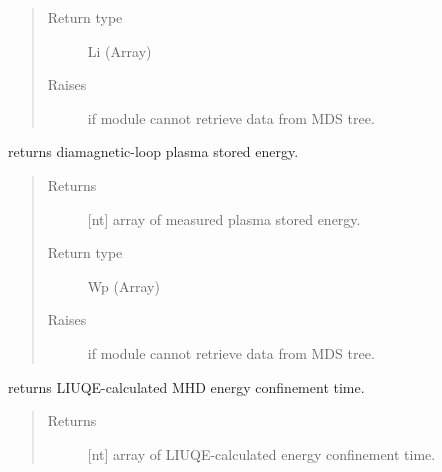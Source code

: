 \documentclass[letterpaper,10pt,english]{sphinxmanual}
\begin{document}
\begin{fulllineitems}
\begin{fulllineitems}
\begin{quote}
\begin{description}
\item[{Return type}] \leavevmode
Li (Array)

\item[{Raises}] \leavevmode
{} \textendash{} if module cannot retrieve data from MDS tree.

\end{description}\end{quote}

\end{fulllineitems}


\begin{fulllineitems}
\label{\detokenize{eqtools:eqtools.TCVLIUQE.TCVLIUQETree.getDiamagWp}}
returns diamagnetic-loop plasma stored energy.
\begin{quote}\begin{description}
\item[{Returns}] \leavevmode
{[}nt{]} array of measured plasma stored energy.

\item[{Return type}] \leavevmode
Wp (Array)

\item[{Raises}] \leavevmode
{} \textendash{} if module cannot retrieve data from MDS tree.

\end{description}\end{quote}

\end{fulllineitems}


\begin{fulllineitems}
\label{\detokenize{eqtools:eqtools.TCVLIUQE.TCVLIUQETree.getTauMHD}}
returns LIUQE-calculated MHD energy confinement time.
\begin{quote}\begin{description}
\item[{Returns}] \leavevmode
{[}nt{]} array of LIUQE-calculated energy confinement time.


\end{description}
\end{quote}
\end{fulllineitems}
\end{fulllineitems}
\end{document}

